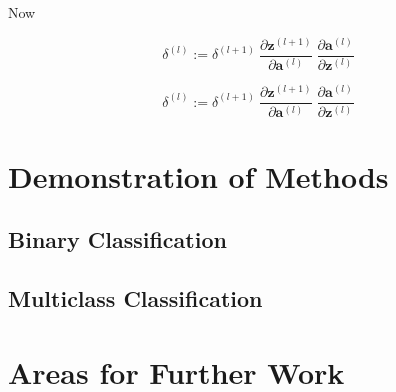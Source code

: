 \documentclass{article}
\begin{document}
        
        Now
        
        
        
        $$
        \delta^{(l)} :=
        \delta^{(l+1)} \
        \frac{\partial \mathbf{z}^{(l+1)}}{\partial \mathbf{a}^{(l)}} \
        \frac{\partial \mathbf{a}^{(l)}}{\partial \mathbf{z}^{(l)}} \
        $$
        
        
        
        $$
        \delta^{(l)} :=
            \delta^{(l+1)} \
            \frac{\partial \mathbf{z}^{(l+1)}}{\partial \mathbf{a}^{(l)}} \
            \frac{\partial \mathbf{a}^{(l)}}{\partial \mathbf{z}^{(l)}} \
        $$
        
        
        
        
        
        






\section{Demonstration of Methods}
\label{sec:demos}

    \subsection{Binary Classification}
    
    \subsection{Multiclass Classification}
    



\section{Areas for Further Work}    





\end{document}

